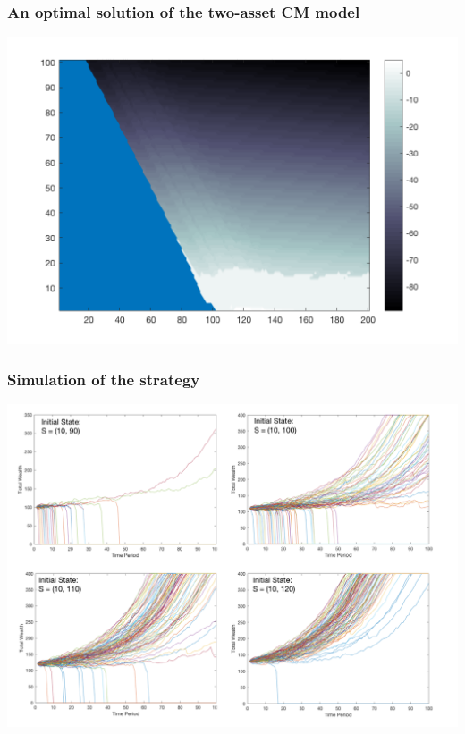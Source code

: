 \documentclass{beamer}
\begin{document}
\begin{frame}
\frametitle{An optimal solution of the two-asset CM model}
\includegraphics[scale = 0.25]{new.png}
\end{frame}

\begin{frame}
\frametitle{Simulation of the strategy}
\includegraphics[scale = 0.4]{simu.png}
\end{frame}
\end{document}
